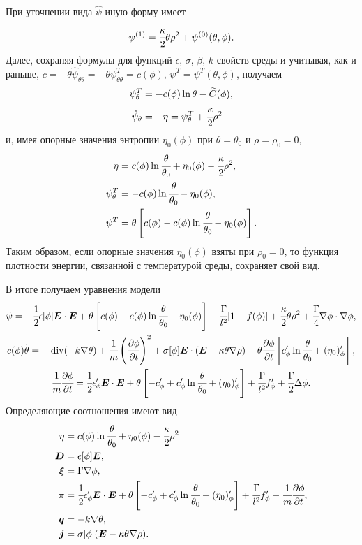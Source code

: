 При уточнении вида $\hat{\psi}$ иную форму имеет
\[
    \psi^{(1)} = \cfrac{\kappa}{2} \theta \rho^2 + \psi^{(0)}(\theta, \phi).
\]
Далее, сохраняя формулы для функций $\epsilon$, $\sigma$, $\beta$, $k$ свойств среды и учитывая, как и раньше, $c = -\theta \hat{\psi}_{\theta \theta} = -\theta \psi^T_{\theta \theta} = c(\phi)$, $\psi^T = \psi^T(\theta, \phi)$, получаем
\begin{align*}
    \psi^T_\theta &= -c(\phi) \ln \theta - \widetilde{C}(\phi), \\
    \hat{\psi}_\theta &= -\eta = \psi^T_\theta + \cfrac{\kappa}{2} \rho^2
\end{align*}
и, имея опорные значения энтропии $\eta_0(\phi)$ при $\theta = \theta_0$ и $\rho = \rho_0 = 0$,
\begin{align*}
    \eta &= c(\phi) \ln \cfrac{\theta}{\theta_0} + \eta_0(\phi) - \cfrac{\kappa}{2} \rho^2, \\
    \psi^T_\theta &= -c(\phi) \ln \cfrac{\theta}{\theta_0} - \eta_0(\phi), \\
    \psi^T &= \theta \left[ c(\phi) - c(\phi) \ln \cfrac{\theta}{\theta_0} - \eta_0(\phi) \right].
\end{align*}
Таким образом, если опорные значения $\eta_0(\phi)$ взяты при $\rho_0 = 0$, то функция плотности энергии, связанной с температурой среды, сохраняет свой вид.

В итоге получаем уравнения модели
{\allowdisplaybreaks
\begin{gather*}
   \psi = -\cfrac{1}{2} \epsilon[\phi] {\boldsymbol{E}} \cdot {\boldsymbol{E}} + \theta \left[ c(\phi) - c(\phi) \ln \cfrac{\theta}{\theta_0} - \eta_0(\phi) \right] + \cfrac{\Gamma}{l^2}[1 - f(\phi)] + \cfrac{\kappa}{2} \theta \rho^2 + \cfrac{\Gamma}{4} \nabla \phi \cdot \nabla \phi, \\
   c(\phi) \overset{\boldsymbol{.}}{\theta} = - \operatorname{{div}}(-k \nabla \theta) + \cfrac{1}{m} \left( \cfrac{\partial \phi}{\partial t} \right)^2 + \sigma[\phi] {\boldsymbol{E}} \cdot ({\boldsymbol{E}} - \kappa \theta \nabla \rho) - \theta \cfrac{\partial \phi}{\partial t} \left[ c'_\phi \ln \cfrac{\theta}{\theta_0} + (\eta_0)'_\phi \right], \\
   \cfrac{1}{m} \cfrac{\partial \phi}{\partial t} = \cfrac{1}{2} \epsilon'_\phi {\boldsymbol{E}} \cdot {\boldsymbol{E}} + \theta \left[ -c'_\phi + c'_\phi \ln \cfrac{\theta}{\theta_0} + (\eta_0)'_\phi \right] + \cfrac{\Gamma}{l^2} f'_\phi + \cfrac{\Gamma}{2} \Delta \phi.
\end{gather*}
}
Определяющие соотношения имеют вид
{\allowdisplaybreaks
\begin{align*}
    \eta &= c(\phi) \ln \cfrac{\theta}{\theta_0} + \eta_0(\phi) - \cfrac{\kappa}{2} \rho^2 \\
    {\boldsymbol{D}} &= \epsilon[\phi] {\boldsymbol{E}}, \\
    {\boldsymbol{\xi}} &= \Gamma \nabla \phi, \\
    \pi &= \cfrac{1}{2} \epsilon'_\phi {\boldsymbol{E}} \cdot {\boldsymbol{E}} + \theta \left[ -c'_\phi + c'_\phi \ln \cfrac{\theta}{\theta_0} + (\eta_0)'_\phi \right] + \cfrac{\Gamma}{l^2} f'_\phi - \cfrac{1}{m} \cfrac{\partial \phi}{\partial t}, \\
    {\boldsymbol{q}} &= -k \nabla \theta, \\
    {\boldsymbol{j}} &= \sigma[\phi] ({\boldsymbol{E}} - \kappa \theta \nabla \rho).
\end{align*}
}

